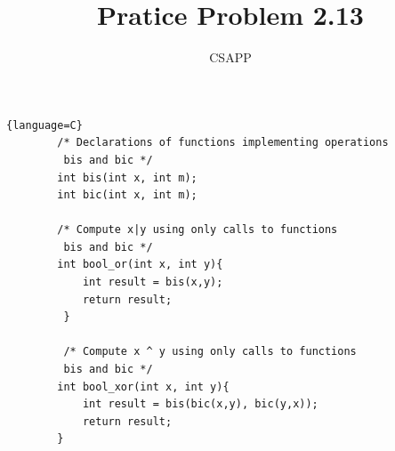 \documentclass{article}
\title{Pratice Problem 2.13}
\author{CSAPP}
\begin{document}
    \maketitle

    \small
    \begin{lstlisting}{language=C}
        /* Declarations of functions implementing operations
         bis and bic */
        int bis(int x, int m);
        int bic(int x, int m);

        /* Compute x|y using only calls to functions
         bis and bic */
        int bool_or(int x, int y){
            int result = bis(x,y);
            return result;
         }

         /* Compute x ^ y using only calls to functions 
         bis and bic */
        int bool_xor(int x, int y){
            int result = bis(bic(x,y), bic(y,x));
            return result;
        }
    \end{lstlisting}
\end{document}
